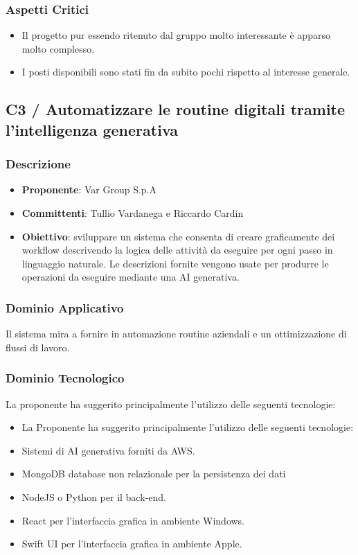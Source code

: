 \documentclass[a4paper, 12pt]{article}
\begin{document}
\subsubsection{Aspetti Critici}
\begin{itemize}
    \item Il progetto pur essendo ritenuto dal gruppo molto interessante è apparso molto complesso.
    \item I posti disponibili sono stati fin da subito pochi rispetto al interesse generale.
\end{itemize}

\subsection{C3 / Automatizzare le routine digitali tramite l’intelligenza generativa}

\subsubsection{Descrizione}
\begin{itemize}
    \item \textbf{Proponente}: Var Group S.p.A
    \item \textbf{Committenti}: Tullio Vardanega e Riccardo Cardin
    \item \textbf{Obiettivo}: sviluppare un sistema che consenta di creare graficamente dei workflow descrivendo la logica delle attività da eseguire per ogni passo in linguaggio naturale.
    Le descrizioni fornite vengono usate per produrre le operazioni da eseguire mediante una AI generativa.    
\end{itemize}

\subsubsection{Dominio Applicativo}
Il sistema mira a fornire in automazione routine aziendali e un ottimizzazione di flussi di lavoro.

\subsubsection{Dominio Tecnologico}
La proponente ha suggerito principalmente l'utilizzo delle seguenti tecnologie:
\begin{itemize}
    \item La Proponente ha suggerito principalmente l’utilizzo delle seguenti tecnologie:
    \item Sistemi di AI generativa forniti da AWS.
    \item MongoDB database non relazionale per la persistenza dei dati 
    \item NodeJS o Python per il back-end.
    \item React per l’interfaccia grafica in ambiente Windows.
    \item Swift UI per l’interfaccia grafica in ambiente Apple.
\end{itemize}
\end{document}
